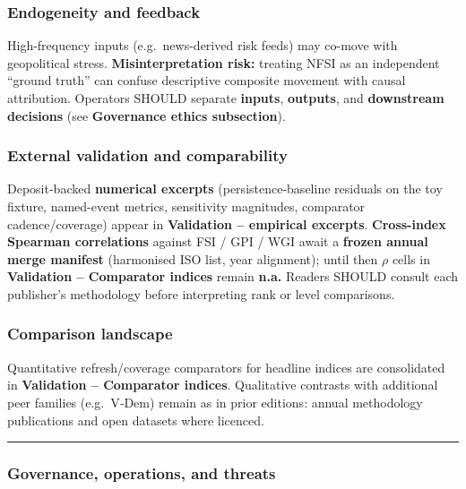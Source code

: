 \documentclass[
  11pt,
  peerreview,journal,onecolumn]{IEEEtran}
\begin{document}
\hypertarget{endogeneity-and-feedback}{%
\subsubsection{Endogeneity and
feedback}\label{endogeneity-and-feedback}}

High-frequency inputs (e.g.~news-derived risk feeds) may co-move with
geopolitical stress. \textbf{Misinterpretation risk:} treating NFSI as
an independent ``ground truth'' can confuse descriptive composite
movement with causal attribution. Operators SHOULD separate
\textbf{inputs}, \textbf{outputs}, and \textbf{downstream decisions}
(see \textbf{Governance ethics subsection}).

\hypertarget{external-validation-and-comparability}{%
\subsubsection{External validation and
comparability}\label{external-validation-and-comparability}}

Deposit-backed \textbf{numerical excerpts} (persistence-baseline
residuals on the toy fixture, named-event metrics, sensitivity
magnitudes, comparator cadence/coverage) appear in \textbf{Validation --
empirical excerpts}. \textbf{Cross-index Spearman correlations} against
FSI / GPI / WGI await a \textbf{frozen annual merge manifest}
(harmonised ISO list, year alignment); until then \(\rho\) cells in
\textbf{Validation -- Comparator indices} remain \textbf{n.a.} Readers
SHOULD consult each publisher's methodology before interpreting rank or
level comparisons.

\hypertarget{comparison-landscape}{%
\subsubsection{Comparison landscape}\label{comparison-landscape}}

Quantitative refresh/coverage comparators for headline indices are
consolidated in \textbf{Validation -- Comparator indices}. Qualitative
contrasts with additional peer families (e.g.~V‑Dem) remain as in prior
editions: annual methodology publications and open datasets where
licenced.

\begin{center}\rule{0.5\linewidth}{0.5pt}\end{center}

\hypertarget{governance-operations-and-threats}{%
\subsubsection{Governance, operations, and
threats}\label{governance-operations-and-threats}}
\end{document}
